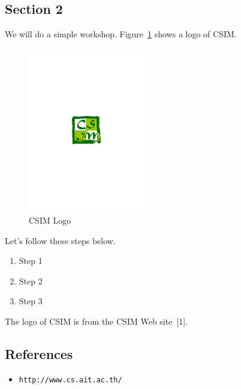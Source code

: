 \documentclass{article}
\begin{document}
\FloatBarrier

\subsection*{Section 2}

\noindent We will do a simple workshop. Figure~\ref{fig:csim-logo} shows
a logo of CSIM. \\

\begin{figure}[t]
    \centering
    \includegraphics[width=2in]{figures/csim}
    \caption{CSIM Logo}
    \label{fig:csim-logo}
\end{figure}

\noindent Let's follow these steps below.

\begin{enumerate}
    \item Step 1
    \item Step 2
    \item Step 3
\end{enumerate}

\noindent The logo of CSIM is from the CSIM Web site~[1]. \\

\subsection*{References}

\begin{itemize}
    \item[1] \tt{http://www.cs.ait.ac.th/}
\end{itemize}
\end{document}
